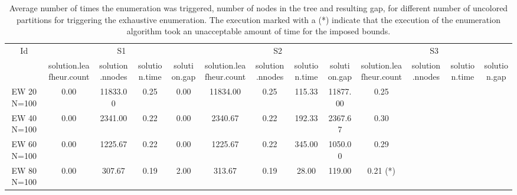 \begin{sidewaystable}[h]
\label{table:bnc:prune}
\centering

\begin{tabular}{|c|cccc|cccc|cccc|}
\hline
\multicolumn{1}{|c|}{Id} & \multicolumn{4}{|c|}{S1} & \multicolumn{4}{|c|}{S2} & \multicolumn{4}{|c|}{S3}
\\
 & solution.leafheur.count & solution.nnodes & solution.time & solution.gap & solution.leafheur.count & solution.nnodes & solution.time & solution.gap & solution.leafheur.count & solution.nnodes & solution.time & solution.gap
\\
\hline
EW 20 N=100 & 0.00 & 11833.00 & 0.25 & 0.00 & 11834.00 & 0.25 & 115.33 & 11877.00 & 0.25
\\
EW 40 N=100 & 0.00 & 2341.00 & 0.22 & 0.00 & 2340.67 & 0.22 & 192.33 & 2367.67 & 0.30
\\
EW 60 N=100 & 0.00 & 1225.67 & 0.22 & 0.00 & 1225.67 & 0.22 & 345.00 & 1050.00 & 0.29
\\
EW 80 N=100 & 0.00 & 307.67 & 0.19 & 2.00 & 313.67 & 0.19 & 28.00 & 119.00 & 0.21 (*)
\\
\hline 
 \end{tabular}

\caption{Average number of times the enumeration was triggered, number of nodes in the tree and resulting gap, for different number of uncolored partitions for triggering the exhaustive enumeration. The execution marked with a (*) indicate that the execution of the enumeration algorithm took an unacceptable amount of time for the imposed bounds.}

\end{sidewaystable}